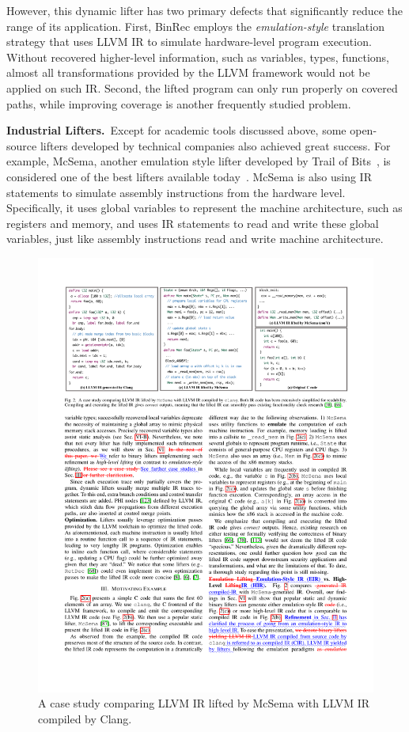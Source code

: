 However, this dynamic lifter has two primary defects that significantly reduce the range of its application. First, BinRec employs the \textit{emulation-style} translation strategy that uses LLVM IR to simulate hardware-level program execution. Without recovered higher-level information, such as variables, types, functions, almost all transformations provided by the LLVM framework would not be applied on such IR. Second, the lifted program can only run properly on covered paths, while improving coverage is another frequently studied problem.

\noindent\textbf{Industrial Lifters.}~Except for academic tools discussed above, some open-source lifters developed by technical companies also achieved great success. For example, McSema, another emulation style lifter developed by Trail of Bits~\cite{trailofbits}, is considered one of the best lifters available today~\cite{mcsema}.
McSema is also using IR statements to simulate assembly instructions from the hardware level. Specifically, it uses global variables to represent the machine architecture, such as registers and memory, and uses IR statements to read and write these global variables, just like assembly instructions read and write machine architecture.

\begin{figure}[tb]
  \centering
  \includegraphics[width=1.0\textwidth]{fig/mcsema.pdf}
  \caption{A case study comparing LLVM IR lifted by McSema with LLVM IR compiled by Clang.}
  \label{fig:mcsema}
\end{figure}

